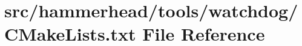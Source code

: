 \hypertarget{tools_2watchdog_2CMakeLists_8txt}{}\section{src/hammerhead/tools/watchdog/\+C\+Make\+Lists.txt File Reference}
\label{tools_2watchdog_2CMakeLists_8txt}
